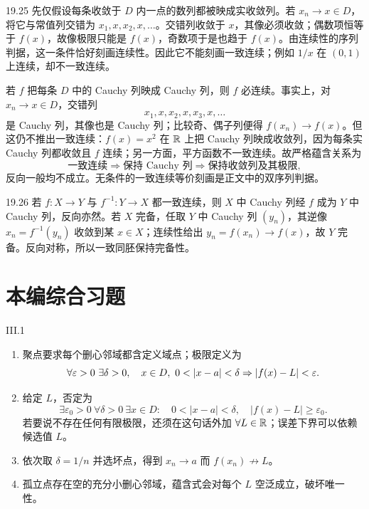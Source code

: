 \begin{solution}{19.25}
先仅假设每条收敛于 \(D\) 内一点的数列都被映成实收敛列。若 \(x_n\to x\in D\)，将它与常值列交错为 \(x_1,x,x_2,x,\ldots\)。交错列收敛于 \(x\)，其像必须收敛；偶数项恒等于 \(f(x)\)，故像极限只能是 \(f(x)\)，奇数项于是也趋于 \(f(x)\)。由连续性的序列判据，这一条件恰好刻画连续性。因此它不能刻画一致连续；例如 \(1/x\) 在 \((0,1)\) 上连续，却不一致连续。

若 \(f\) 把每条 \(D\) 中的 Cauchy 列映成 Cauchy 列，则 \(f\) 必连续。事实上，对 \(x_n\to x\in D\)，交错列
\[
 x_1,x,x_2,x,x_3,x,\ldots
\]
是 Cauchy 列，其像也是 Cauchy 列；比较奇、偶子列便得 \(f(x_n)\to f(x)\)。但这仍不推出一致连续：\(f(x)=x^2\) 在 \(\mathbb{R}\) 上把 Cauchy 列映成收敛列，因为每条实 Cauchy 列都收敛且 \(f\) 连续；另一方面，平方函数不一致连续。故严格蕴含关系为
\[
 \text{一致连续}\Longrightarrow
 \text{保持 Cauchy 列}\Longrightarrow
 \text{保持收敛列及其极限},
\]
反向一般均不成立。无条件的一致连续等价刻画是正文中的双序列判据。
\end{solution}

\begin{solution}{19.26}
若 \(f:X\to Y\) 与 \(f^{-1}:Y\to X\) 都一致连续，则 \(X\) 中 Cauchy 列经 \(f\) 成为 \(Y\) 中 Cauchy 列，反向亦然。若 \(X\) 完备，任取 \(Y\) 中 Cauchy 列 \((y_n)\)，其逆像 \(x_n=f^{-1}(y_n)\) 收敛到某 \(x\in X\)；连续性给出 \(y_n=f(x_n)\to f(x)\)，故 \(Y\) 完备。反向对称，所以一致同胚保持完备性。
\end{solution}

\section*{本编综合习题}

\begin{solution}{III.1}
\begin{enumerate}
 \item 聚点要求每个删心邻域都含定义域点；极限定义为
 \[
  \forall\varepsilon>0\ \exists\delta>0,\quad
  x\in D,\ 0<\left|x-a\right|<\delta
  \Rightarrow\left|f(x)-L\right|<\varepsilon.
 \]
 \item 给定 \(L\)，否定为
 \[
 \exists\varepsilon_0>0\ \forall\delta>0\ \exists x\in D:
 \quad0<|x-a|<\delta,\quad|f(x)-L|\ge\varepsilon_0.
 \]
 若要说不存在任何有限极限，还须在这句话外加 \(\forall L\in\mathbb{R}\)；误差下界可以依赖候选值 \(L\)。
 \item 依次取 \(\delta=1/n\) 并选坏点，得到 \(x_n\to a\) 而 \(f(x_n)\not\to L\)。
 \item 孤立点存在空的充分小删心邻域，蕴含式会对每个 \(L\) 空泛成立，破坏唯一性。
\end{enumerate}
\end{solution}

